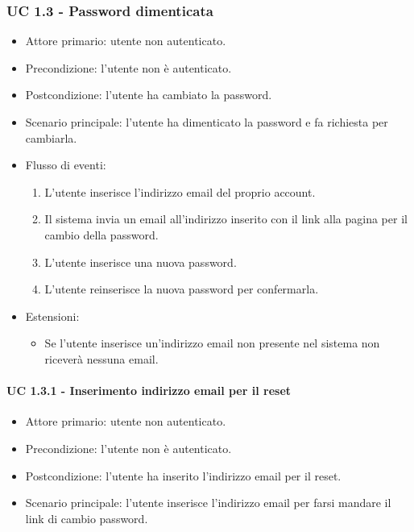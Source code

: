     \subsubsection{UC 1.3 - Password dimenticata}
        \begin{itemize}
            \item Attore primario: utente non autenticato.
            \item Precondizione: l'utente non è autenticato.
            \item Postcondizione: l'utente ha cambiato la password.
            \item Scenario principale: l'utente ha dimenticato la password e fa richiesta per cambiarla.
            \item Flusso di eventi:
                \begin{enumerate}
                    \item L'utente inserisce l'indirizzo email del proprio account.
                    \item Il sistema invia un email all'indirizzo inserito con il link alla pagina per il cambio della password.
                    \item L'utente inserisce una nuova password.
                    \item L'utente reinserisce la nuova password per confermarla.
                \end{enumerate}
            \item Estensioni:
                \begin{itemize}
                    \item Se l'utente inserisce un'indirizzo email non presente nel sistema non riceverà nessuna email.
                \end{itemize}
        \end{itemize}
        \paragraph{UC 1.3.1 - Inserimento indirizzo email per il reset}
            \begin{itemize}
                \item Attore primario: utente non autenticato.
                \item Precondizione: l'utente non è autenticato.
                \item Postcondizione: l'utente ha inserito l'indirizzo email per il reset.
                \item Scenario principale: l'utente inserisce l'indirizzo email per farsi mandare il link di cambio password.
            \end{itemize}
